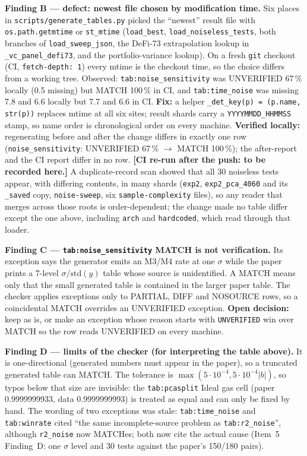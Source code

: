 \documentclass[11pt]{article}
\begin{document}
\textbf{Finding B --- defect: newest file chosen by modification time.} Six places in
\texttt{scripts/generate\_tables.py} picked the ``newest'' result file with \texttt{os.path.getmtime} or
\texttt{st\_mtime} (\texttt{load\_best}, \texttt{load\_noiseless\_tests}, both branches of \texttt{load\_sweep\_json},
the DeFi-73 extrapolation lookup in \texttt{\_vc\_panel\_defi73}, and the portfolio-variance lookup). On a fresh
\texttt{git} checkout (CI, \texttt{fetch-depth: 1}) every mtime is the checkout time, so the choice differs from a
working tree. Observed: \texttt{tab:noise\_sensitivity} was UNVERIFIED 67\,\% locally (0.5 missing) but MATCH 100\,\%
in CI, and \texttt{tab:time\_noise} was missing 7.8 and 6.6 locally but 7.7 and 6.6 in CI. \textbf{Fix:} a helper
\texttt{\_det\_key(p) = (p.name, str(p))} replaces mtime at all six sites; result shards carry a \texttt{YYYYMMDD\_HHMMSS}
stamp, so name order is chronological order on every machine. \textbf{Verified locally:} regenerating before and
after the change differs in exactly one row (\texttt{noise\_sensitivity}: UNVERIFIED 67\,\% $\to$ MATCH 100\,\%);
the after-report and the CI report differ in no row. \textbf{[CI re-run after the push: to be recorded here.]}
A duplicate-record scan showed that all 30 noiseless tests appear, with differing contents, in many shards
(\texttt{exp2}, \texttt{exp2\_pca\_4060} and its \texttt{\_saved} copy, \texttt{noise-sweep}, six
\texttt{sample-complexity} files), so any reader that merges across those roots is order-dependent; the change made
no table differ except the one above, including \texttt{arch} and \texttt{hardcoded}, which read through that loader.

\textbf{Finding C --- \texttt{tab:noise\_sensitivity} MATCH is not verification.} Its exception says the generator emits
an M3/M4 rate at one $\sigma$ while the paper prints a 7-level $\sigma/\mathrm{std}(y)$ table whose source is
unidentified. A MATCH means only that the small generated table is contained in the larger paper table. The checker
applies exceptions only to PARTIAL, DIFF and NOSOURCE rows, so a coincidental MATCH overrides an UNVERIFIED
exception. \textbf{Open decision:} keep as is, or make an exception whose reason starts with \texttt{UNVERIFIED}
win over MATCH so the row reads UNVERIFIED on every machine.

\textbf{Finding D --- limits of the checker (for interpreting the table above).} It is one-directional (generated numbers
must appear in the paper), so a truncated generated table can MATCH. The tolerance is $\max(5\cdot10^{-4},
5\cdot10^{-4}|b|)$, so typos below that size are invisible: the \texttt{tab:pcasplit} Ideal gas cell (paper 0.9999999933,
data 0.9999999993) is treated as equal and can only be fixed by hand. The wording of two exceptions was stale:
\texttt{tab:time\_noise} and \texttt{tab:winrate} cited ``the same incomplete-source problem as \texttt{tab:r2\_noise}'',
although \texttt{r2\_noise} now MATCHes; both now cite the actual cause (Item~5 Finding~D: one $\sigma$ level and 30 tests
against the paper's 150/180 pairs).
\end{document}
